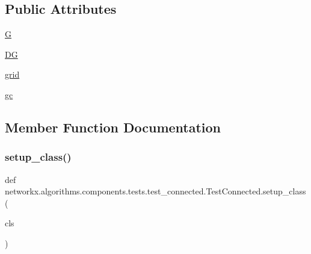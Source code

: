 \subsection*{Public Attributes}
\begin{DoxyCompactItemize}
\item 
\hyperlink{classnetworkx_1_1algorithms_1_1components_1_1tests_1_1test__connected_1_1TestConnected_aa087262d2334630a9b84191a792c6cae}{G}
\item 
\hyperlink{classnetworkx_1_1algorithms_1_1components_1_1tests_1_1test__connected_1_1TestConnected_a193dc95eb3c54ee0858bd4715ca441f5}{DG}
\item 
\hyperlink{classnetworkx_1_1algorithms_1_1components_1_1tests_1_1test__connected_1_1TestConnected_a4da8533e963ac9ec636721be0f017926}{grid}
\item 
\hyperlink{classnetworkx_1_1algorithms_1_1components_1_1tests_1_1test__connected_1_1TestConnected_a065eafbb50f3c8191b6cc99f35d15e09}{gc}
\end{DoxyCompactItemize}


\subsection{Member Function Documentation}
\mbox{\label{classnetworkx_1_1algorithms_1_1components_1_1tests_1_1test__connected_1_1TestConnected_a5fd76241198a37c87ca29771b9c95079}} 
\subsubsection{\texorpdfstring{setup\+\_\+class()}{setup\_class()}}
{\footnotesize\ttfamily def networkx.\+algorithms.\+components.\+tests.\+test\+\_\+connected.\+Test\+Connected.\+setup\+\_\+class (\begin{DoxyParamCaption}\item[{}]{cls }\end{DoxyParamCaption})}


